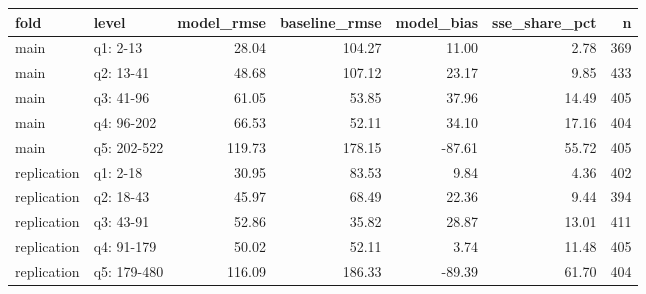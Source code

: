 \begin{tabular}{llrrrrr}
\toprule
fold & level & model\_rmse & baseline\_rmse & model\_bias & sse\_share\_pct & n \\
\midrule
main & q1: 2-13 & 28.04 & 104.27 & 11.00 & 2.78 & 369 \\
main & q2: 13-41 & 48.68 & 107.12 & 23.17 & 9.85 & 433 \\
main & q3: 41-96 & 61.05 & 53.85 & 37.96 & 14.49 & 405 \\
main & q4: 96-202 & 66.53 & 52.11 & 34.10 & 17.16 & 404 \\
main & q5: 202-522 & 119.73 & 178.15 & -87.61 & 55.72 & 405 \\
replication & q1: 2-18 & 30.95 & 83.53 & 9.84 & 4.36 & 402 \\
replication & q2: 18-43 & 45.97 & 68.49 & 22.36 & 9.44 & 394 \\
replication & q3: 43-91 & 52.86 & 35.82 & 28.87 & 13.01 & 411 \\
replication & q4: 91-179 & 50.02 & 52.11 & 3.74 & 11.48 & 405 \\
replication & q5: 179-480 & 116.09 & 186.33 & -89.39 & 61.70 & 404 \\
\bottomrule
\end{tabular}
